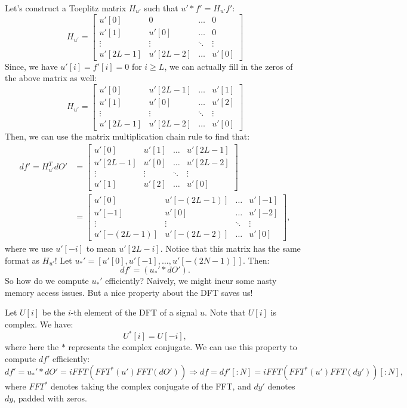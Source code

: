 Let's construct a Toeplitz matrix $H_{u'}$ such that $u' \ast f' = H_{u'} f'$:
$$
H_{u'} = \begin{bmatrix}
  u'[0] & 0     & \dots & 0 \\
  u'[1] & u'[0] & \dots & 0 \\
  \vdots & \vdots & \ddots & \vdots \\
  u'[2L-1] & u'[2L-2] & \dots & u'[0]
\end{bmatrix}
$$
Since, we have $u'[i] = f'[i] = 0$ for $i \geq L$, we can actually fill in the zeros of the above matrix as well:
$$
H_{u'} = \begin{bmatrix}
  u'[0] & u'[2L-1] & \dots & u'[1] \\
  u'[1] & u'[0] & \dots & u'[2] \\
  \vdots & \vdots & \ddots & \vdots \\
  u'[2L-1] & u'[2L-2] & \dots & u'[0]
\end{bmatrix}
$$
Then, we can use the matrix multiplication chain rule to find that:
\begin{align*}
df' = H_{u'}^T dO' &= \begin{bmatrix}
  u'[0] & u'[1] & \dots & u'[2L-1] \\
  u'[2L-1] & u'[0] & \dots & u'[2L-2] \\
  \vdots & \vdots & \ddots & \vdots \\
  u'[1] & u'[2] & \dots & u'[0]
\end{bmatrix} \\
&= \begin{bmatrix}
  u'[0] & u'[-(2L-1)] & \dots & u'[-1] \\
  u'[-1] & u'[0] & \dots & u'[-2] \\
  \vdots & \vdots & \ddots & \vdots \\
  u'[-(2L-1)] & u'[-(2L-2)] & \dots & u'[0]
\end{bmatrix},
\end{align*}
where we use $u'[-i]$ to mean $u'[2L - i]$.
Notice that this matrix has the same format as $H_{u'}$!
Let $u_*' = [u'[0], u'[-1], \dots, u'[-(2N-1)]]$.
Then:
$$
df' = (u_*' \ast dO').
$$
So how do we compute $u_*'$ efficiently?
Naively, we might incur some nasty memory access issues.
But a nice property about the DFT saves us!

Let $U[i]$ be the $i$-th element of the DFT of a signal $u$.
Note that $U[i]$ is complex.
We have:
$$
U^*[i] = U[-i],
$$
where here the $*$ represents the complex conjugate.
We can use this property to compute $df'$ efficiently:
$$df' = u_*' \ast dO'= iFFT(FFT^*(u')FFT(dO')) \Rightarrow df = df'[:N] = iFFT(FFT^*(u')FFT(dy'))[:N],$$
where $FFT^*$ denotes taking the complex conjugate of the FFT, and $dy'$ denotes $dy$, padded with zeros.

